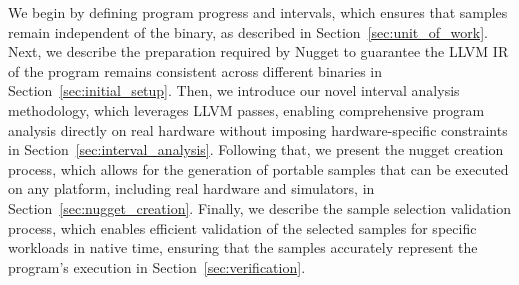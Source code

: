 We begin by defining program progress and intervals, which ensures that samples remain independent of the binary, as described in Section~\ref{sec:unit_of_work}.
Next, we describe the preparation required by Nugget to guarantee the LLVM IR of the program remains consistent across different binaries in Section~\ref{sec:initial_setup}.
Then, we introduce our novel interval analysis methodology, which leverages LLVM passes, enabling comprehensive program analysis directly on real hardware without imposing hardware-specific constraints in Section~\ref{sec:interval_analysis}.
Following that, we present the nugget creation process, which allows for the generation of portable samples that can be executed on any platform, including real hardware and simulators, in Section~\ref{sec:nugget_creation}.
Finally, we describe the sample selection validation process, which enables efficient validation of the selected samples for specific workloads in native time, ensuring that the samples accurately represent the program's execution in Section~\ref{sec:verification}.
